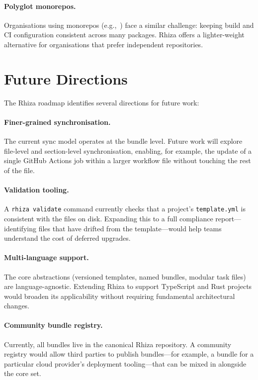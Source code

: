 \documentclass[12pt,a4paper]{article}
\begin{document}
\paragraph{Polyglot monorepos.} Organisations using monorepos (e.g.,~\cite{potvin2016google}) face a similar challenge: keeping build and CI configuration consistent across many packages. Rhiza offers a lighter-weight alternative for organisations that prefer independent repositories.

\section{Future Directions}
\label{sec:future}

The Rhiza roadmap identifies several directions for future work:

\paragraph{Finer-grained synchronisation.} The current sync model operates at the bundle level. Future work will explore file-level and section-level synchronisation, enabling, for example, the update of a single GitHub Actions job within a larger workflow file without touching the rest of the file.

\paragraph{Validation tooling.} A \texttt{rhiza validate} command currently checks that a project's \texttt{template.yml} is consistent with the files on disk. Expanding this to a full compliance report---identifying files that have drifted from the template---would help teams understand the cost of deferred upgrades.

\paragraph{Multi-language support.} The core abstractions (versioned templates, named bundles, modular task files) are language-agnostic. Extending Rhiza to support TypeScript and Rust projects would broaden its applicability without requiring fundamental architectural changes.

\paragraph{Community bundle registry.} Currently, all bundles live in the canonical Rhiza repository. A community registry would allow third parties to publish bundles---for example, a bundle for a particular cloud provider's deployment tooling---that can be mixed in alongside the core set.
\end{document}
